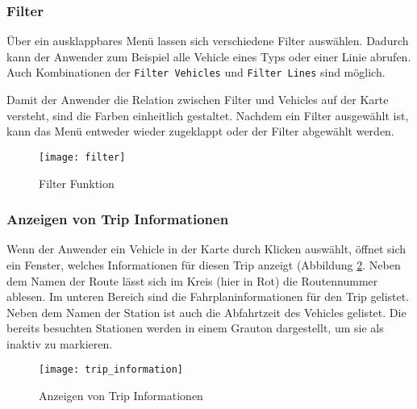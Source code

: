 
  \subsubsection*{Filter}
  \label{ssub:filter}
    Über ein ausklappbares Menü lassen sich verschiedene Filter auswählen. Dadurch kann der Anwender zum Beispiel alle Vehicle eines Typs oder einer Linie abrufen. Auch Kombinationen der \texttt{Filter Vehicles} und \texttt{Filter Lines} sind möglich.

    Damit der Anwender die Relation zwischen Filter und Vehicles auf der Karte versteht, sind die Farben einheitlich gestaltet. Nachdem ein Filter ausgewählt ist, kann das Menü entweder wieder zugeklappt oder der Filter abgewählt werden.

    \begin{figure}[htbp]
      \begin{center}
        \texttt{[image: filter]}
        \caption{Filter Funktion}
        \label{fig:filter}
      \end{center}
    \end{figure}
    

  \subsubsection*{Anzeigen von Trip Informationen}
  \label{ssub:anzeigen_von_trip_informationen}
    Wenn der Anwender ein Vehicle in der Karte durch Klicken auswählt, öffnet sich ein Fenster, welches Informationen für diesen Trip anzeigt (Abbildung \ref{fig:trip_information}. Neben dem Namen der Route lässt sich im Kreis (hier in Rot) die Routennummer ablesen. Im unteren Bereich sind die Fahrplaninformationen für den Trip gelistet. Neben dem Namen der Station ist auch die Abfahrtzeit des Vehicles gelistet. Die bereits besuchten Stationen werden in einem Grauton dargestellt, um sie als inaktiv zu markieren.

    \begin{figure}[htbp]
      \begin{center}
        \texttt{[image: trip\_information]}
        \caption{Anzeigen von Trip Informationen}
        \label{fig:trip_information}
      \end{center}
    \end{figure}
    

